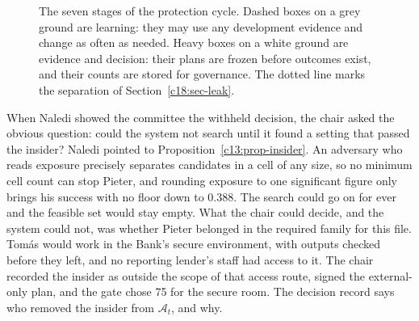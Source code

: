 \begin{figure}[ht]
\centering
{}
\caption{The seven stages of the protection cycle. Dashed boxes on a grey ground are learning:
they may use any development evidence and change as often as needed. Heavy boxes on a white
ground are evidence and decision: their plans are frozen before outcomes exist, and their counts are
stored for governance. The dotted line marks the separation of Section~\ref{c18:sec-leak}.}
\label{c18:fig-cycle}
\end{figure}

When Naledi showed the committee the withheld decision, the chair asked the obvious
question: could the system not search until it found a setting that passed the insider? Naledi
pointed to Proposition~\ref{c13:prop-insider}. An adversary who reads exposure precisely separates candidates in a cell of any size, so no minimum cell count can stop Pieter, and rounding exposure
to one significant figure only brings his success with no floor down to $0.388$. The search
could go on for ever and the feasible set would stay empty. What the chair could decide,
and the system could not, was whether Pieter belonged in the required family for this file.
Tom\'as would work in the Bank's secure environment, with outputs checked before they left,
and no reporting lender's staff had access to it. The chair recorded the insider as outside the
scope of that access route, signed the external-only plan, and the gate chose 75 for the secure
room. The decision record says who removed the insider from $\mathcal A_t$, and why.

